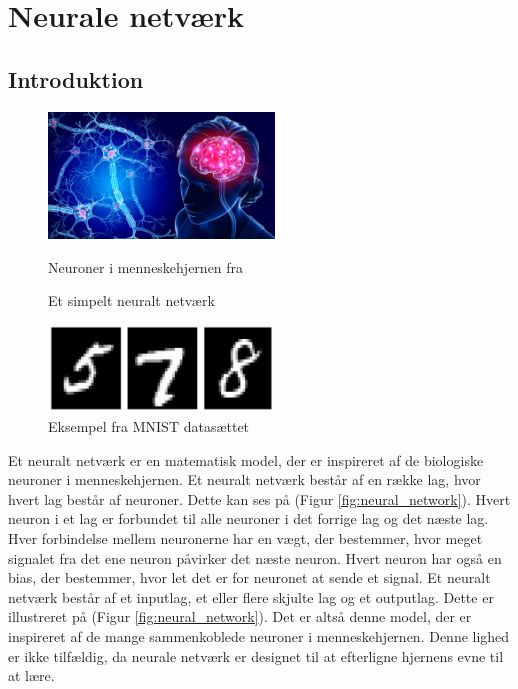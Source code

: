 \documentclass{article}
\newcommand{\figureref}[1]{(Figur \ref{#1})}
\begin{document}
\section{Neurale netværk}
\subsection{Introduktion}
\begin{figure}
  \vspace{-0.5cm}
  \includegraphics[width=6cm]{neurons.jpg}
  \vspace{-0.8cm}
  \caption{Neuroner i menneskehjernen fra \parencite{St_Clair_2021}}
  \label{fig:neurons}
  \vspace{0.5cm}
  
  \vspace{-0.8cm}
  \caption{Et simpelt neuralt netværk}
  \label{fig:neural_network}
  \vspace{0.5cm}
  \includegraphics[width=6cm]{mnist1.jpg}
  \vspace{-0.8cm}
  \caption{Eksempel fra MNIST datasættet \parencite{LeCun_1994}}
  \label{fig:mnist}
\end{figure}
Et neuralt netværk er en matematisk model, der er inspireret af de biologiske neuroner i menneskehjernen. Et neuralt netværk består af en række lag, hvor hvert lag består af neuroner. Dette kan ses på \figureref{fig:neural_network}. Hvert neuron i et lag er forbundet til alle neuroner i det forrige lag og det næste lag. Hver forbindelse mellem neuronerne har en vægt, der bestemmer, hvor meget signalet fra det ene neuron påvirker det næste neuron. Hvert neuron har også en bias, der bestemmer, hvor let det er for neuronet at sende et signal. Et neuralt netværk består af et \color{red!90}inputlag\color{black}, et eller flere \color{violet!90}skjulte lag \color{black} og et \color{blue!90}outputlag\color{black}. Dette er illustreret på \figureref{fig:neural_network}. Det er altså denne model, der er inspireret af de mange sammenkoblede neuroner i menneskehjernen. Denne lighed er ikke tilfældig, da neurale netværk er designet til at efterligne hjernens evne til at lære.\\
\end{document}
